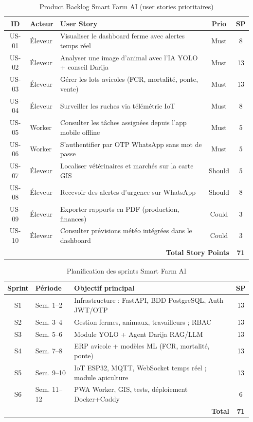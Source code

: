 \begin{table}[H]
\centering
\caption{Product Backlog Smart Farm AI (user stories prioritaires)}
\label{tab:product_backlog}
\begin{tabularx}{\linewidth}{clXcc}
\toprule
\textbf{ID} & \textbf{Acteur} & \textbf{User Story} & \textbf{Prio} & \textbf{SP} \\
\midrule
US-01 & Éleveur  & Visualiser le dashboard ferme avec alertes temps réel & Must & 8 \\
US-02 & Éleveur  & Analyser une image d'animal avec l'IA YOLO + conseil Darija & Must & 13 \\
US-03 & Éleveur  & Gérer les lots avicoles (FCR, mortalité, ponte, vente) & Must & 13 \\
US-04 & Éleveur  & Surveiller les ruches via télémétrie IoT & Must & 8 \\
US-05 & Worker   & Consulter les tâches assignées depuis l'app mobile offline & Must & 5 \\
US-06 & Worker   & S'authentifier par OTP WhatsApp sans mot de passe & Must & 5 \\
US-07 & Éleveur  & Localiser vétérinaires et marchés sur la carte GIS & Should & 5 \\
US-08 & Éleveur  & Recevoir des alertes d'urgence sur WhatsApp & Should & 8 \\
US-09 & Éleveur  & Exporter rapports en PDF (production, finances) & Could & 3 \\
US-10 & Éleveur  & Consulter prévisions météo intégrées dans le dashboard & Could & 3 \\
\midrule
\multicolumn{4}{r}{\textbf{Total Story Points}} & \textbf{71} \\
\bottomrule
\end{tabularx}
\end{table}

\begin{table}[H]
\centering
\caption{Planification des sprints Smart Farm AI}
\label{tab:sprints}
\begin{tabularx}{\linewidth}{clXc}
\toprule
\textbf{Sprint} & \textbf{Période} & \textbf{Objectif principal} & \textbf{SP} \\
\midrule
S1 & Sem. 1--2  & Infrastructure : FastAPI, BDD PostgreSQL, Auth JWT/OTP & 13 \\
S2 & Sem. 3--4  & Gestion fermes, animaux, travailleurs ; RBAC & 13 \\
S3 & Sem. 5--6  & Module YOLO + Agent Darija RAG/LLM & 13 \\
S4 & Sem. 7--8  & ERP avicole + modèles ML (FCR, mortalité, ponte) & 13 \\
S5 & Sem. 9--10 & IoT ESP32, MQTT, WebSocket temps réel ; module apiculture & 13 \\
S6 & Sem. 11--12& PWA Worker, GIS, tests, déploiement Docker+Caddy & 6 \\
\midrule
\multicolumn{3}{r}{\textbf{Total}} & \textbf{71} \\
\bottomrule
\end{tabularx}
\end{table}

